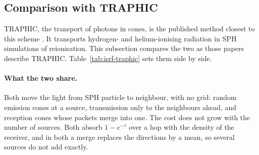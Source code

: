 \subsection{Comparison with TRAPHIC}
\label{sec:isrf-traphic}

TRAPHIC, the transport of photons in cones, is the published method closest
to this scheme \citep{PawlikSchaye2008,PawlikSchaye2011}. It transports
hydrogen- and helium-ionising radiation in SPH simulations of reionisation.
This subsection compares the two as those papers describe TRAPHIC.
Table~\ref{tab:isrf-traphic} sets them side by side.

\paragraph{What the two share.} Both move the light from SPH particle to
neighbour, with no grid: random emission cones at a source, transmission only
to the neighbours ahead, and reception cones whose packets merge into one. The
cost does not grow with the number of sources. Both absorb $1-e^{-\tau}$ over
a hop with the density of the receiver, and in both a merge replaces the
directions by a mean, so several sources do not add exactly.

